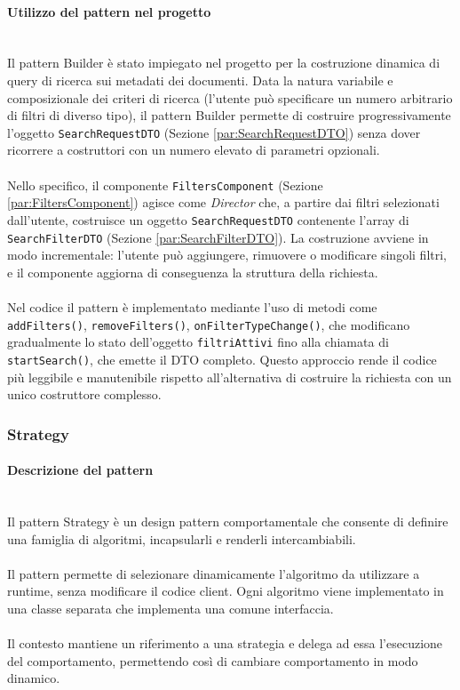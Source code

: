 \documentclass[a4paper,12pt]{article}
\begin{document}
{{{                \paragraph{ Utilizzo del pattern nel progetto}\mbox{}\\
                Il pattern Builder è stato impiegato nel progetto per la costruzione dinamica di query di ricerca sui metadati dei documenti. Data la natura variabile e composizionale dei criteri di ricerca (l'utente può specificare un numero arbitrario di filtri di diverso tipo), il pattern Builder permette di costruire progressivamente l'oggetto \texttt{SearchRequestDTO} (Sezione \ref{par:SearchRequestDTO}) senza dover ricorrere a costruttori con un numero elevato di parametri opzionali.\\
                \\
                Nello specifico, il componente \texttt{FiltersComponent} (Sezione \ref{par:FiltersComponent}) agisce come \textit{Director} che, a partire dai filtri selezionati dall'utente, costruisce un oggetto \texttt{SearchRequestDTO} contenente l'array di \texttt{SearchFilterDTO} (Sezione \ref{par:SearchFilterDTO}). La costruzione avviene in modo incrementale: l'utente può aggiungere, rimuovere o modificare singoli filtri, e il componente aggiorna di conseguenza la struttura della richiesta.\\
                \\
                Nel codice il pattern è implementato mediante l'uso di metodi come \texttt{addFilters()}, \texttt{removeFilters()}, \texttt{onFilterTypeChange()}, che modificano gradualmente lo stato dell'oggetto \texttt{filtriAttivi} fino alla chiamata di \texttt{startSearch()}, che emette il DTO completo. Questo approccio rende il codice più leggibile e manutenibile rispetto all'alternativa di costruire la richiesta con un unico costruttore complesso.
            }
            \subsubsection{Strategy} {
                \paragraph{Descrizione del pattern}\mbox{}\\
                Il pattern Strategy è un design pattern comportamentale che consente di definire una famiglia di algoritmi, incapsularli e renderli intercambiabili.\\
                \\
                Il pattern permette di selezionare dinamicamente l’algoritmo da utilizzare a runtime, senza modificare il codice client. Ogni algoritmo viene implementato in una classe separata che implementa una comune interfaccia.\\
                \\
                Il contesto mantiene un riferimento a una strategia e delega ad essa l’esecuzione del comportamento, permettendo così di cambiare comportamento in modo dinamico.
                
}}}
\end{document}
